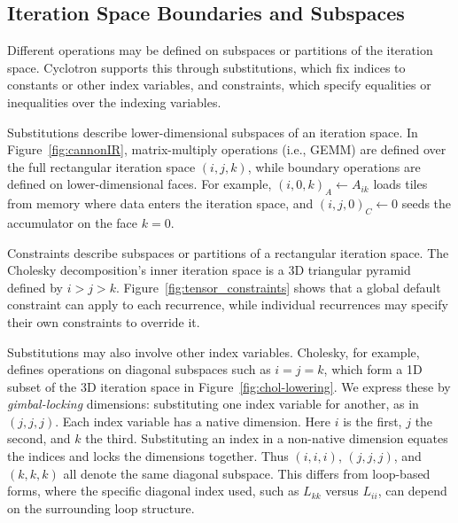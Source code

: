 \documentclass[sigplan, nonacm]{acmart}
\begin{document}
\subsection{Iteration Space Boundaries and Subspaces}
Different operations may be defined on subspaces or partitions of the iteration space. Cyclotron supports this through substitutions, which fix indices to constants or other index variables, and constraints, which specify equalities or inequalities over the indexing variables.

Substitutions describe lower-dimensional subspaces of an iteration space. In Figure~\ref{fig:cannonIR}, matrix-multiply operations (i.e., GEMM) are defined over the full rectangular iteration space $(i,j,k)$, while boundary operations are defined on lower-dimensional faces. For example, $(i,0,k)_{A} \leftarrow A_{ik}$ loads tiles from memory where data enters the iteration space, and $(i,j,0)_{C} \leftarrow 0$ seeds the accumulator on the face $k=0$.

Constraints describe subspaces or partitions of a rectangular iteration space. The Cholesky decomposition's inner iteration space is a 3D triangular pyramid defined by $i>j>k$. Figure~\ref{fig:tensor_constraints} shows that a global default constraint can apply to each recurrence, while individual recurrences may specify their own constraints to override it.


 

Substitutions may also involve other index variables. Cholesky, for example, defines operations on diagonal subspaces such as \(i=j=k\), which form a 1D subset of the 3D iteration space in Figure~\ref{fig:chol-lowering}. We express these by \emph{gimbal-locking} dimensions: substituting one index variable for another, as in \((j,j,j)\). 
Each index variable has a native dimension. Here \(i\) is the first, \(j\) the second, and \(k\) the third. Substituting an index in a non-native dimension equates the indices and locks the dimensions together. Thus \((i,i,i)\), \((j,j,j)\), and \((k,k,k)\) all denote the same diagonal subspace. This differs from loop-based forms, where the specific diagonal index used, such as \(L_{kk}\) versus \(L_{ii}\),  can depend on the surrounding loop structure.
\end{document}
